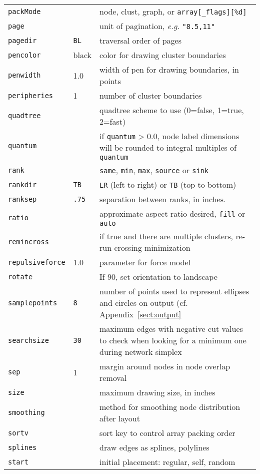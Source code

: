 \documentclass[11pt]{article}
\begin{document}
\begin{table}[p]
\begin{tabular}[t]{|l|l|p{3.5in}|}
{\tt packMode} & & node, clust, graph, or \verb"array[_flags][%d]" \\
{\tt page} & & unit of pagination, {\it e.g.} {\tt "8.5,11"} \\
{\tt pagedir} & {\tt BL} & traversal order of pages \\
{\tt pencolor} & black & color for drawing cluster boundaries \\
{\tt penwidth} & 1.0 & width of pen for drawing boundaries, in points \\
{\tt peripheries} & 1 & number of cluster boundaries \\
{\tt quadtree} & & quadtree scheme to use (0=false, 1=true, 2=fast)\\
{\tt quantum} &  & if {\tt quantum} > 0.0, node label dimensions will be 
rounded to integral multiples of {\tt quantum} \\
{\tt rank} & & {\tt same}, {\tt min}, {\tt max}, {\tt source} or {\tt sink} \\
{\tt rankdir} & {\tt TB} & {\tt LR} (left to right) or {\tt TB} (top to bottom) \\
{\tt ranksep} & {\tt .75} & separation between ranks, in inches. \\
{\tt ratio} & & approximate aspect ratio desired, {\tt fill} or {\tt auto} \\
{\tt remincross} & & if true and there are multiple clusters, re-run crossing
minimization \\
{\tt repulsiveforce} & 1.0 & parameter for force model \\
{\tt rotate} & & If 90, set orientation to landscape \\
{\tt samplepoints} & {\tt 8} & number of points used to represent ellipses
and circles on output (cf.  Appendix~\ref{sect:output} \\
{\tt searchsize} & {\tt 30} & maximum edges with negative cut values to
check when looking for a minimum one during network simplex \\
{\tt sep} & 1 & margin around nodes in node overlap removal \\
{\tt size} & & maximum drawing size, in inches \\
{\tt smoothing} & & method for smoothing node distribution after layout \\
{\tt sortv} & & sort key to control array packing order \\
{\tt splines} & & draw edges as splines, polylines \\
{\tt start} & & initial placement: regular, self, random \\

\end{tabular}
\end{table}
\end{document}

